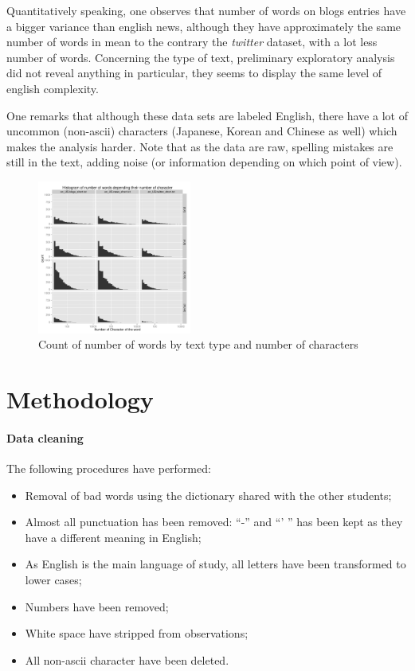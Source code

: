 \documentclass[a4paper]{article}
\begin{document}
Quantitatively speaking, one observes that number of words on blogs entries have
a bigger variance than english news, although they have approximately the same
number of words in mean to the contrary the \textit{twitter} dataset, with a lot
less number of words. Concerning the type of text, preliminary exploratory
analysis did not reveal anything in particular, they seems to display the same
level of english complexity. 

One remarks that although these data sets are labeled English, there have a lot
of uncommon (non-ascii) characters (Japanese, Korean and Chinese as well) which
makes the analysis harder. Note that as the data are raw, spelling mistakes are
still in the text, adding noise (or information depending on which point of
view). 

\begin{figure}[h!]
\centering
\includegraphics[width=0.45\textwidth]{plots/hist_num_char.pdf}
\caption{Count of number of words by text type and number of characters}
\label{fig:character_per_words}
\end{figure}


\section{Methodology}
\paragraph{Data cleaning}
The following procedures have performed:
\begin{itemize}
  \item Removal of bad words using the dictionary shared with the other students;
  \item Almost all punctuation has been removed: ``-'' and ``' ''  has been kept
    as they have a different meaning in English;
  \item As English is the main language of study, all letters have been
    transformed to lower cases;
  \item Numbers have been removed;
  \item White space have stripped from observations;
  \item All non-ascii character have been deleted.
\end{itemize}
\end{document}
